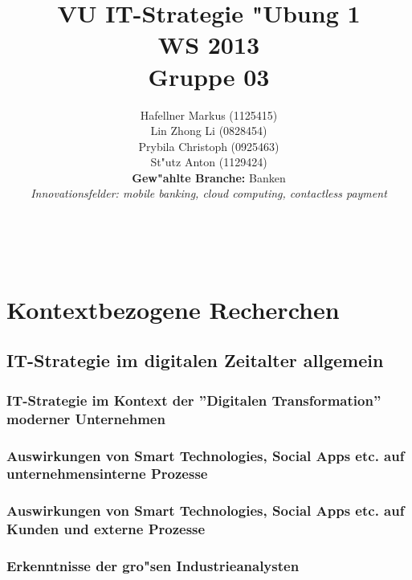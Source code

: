 \documentclass[a4paper, 12pt]{article} %
\title{\textbf{VU IT-Strategie "Ubung 1}\\ %
WS 2013\\\vspace{5pt}
Gruppe 03} %
\author{Hafellner Markus (1125415)\\
 Lin Zhong Li (0828454)\\
 Prybila Christoph (0925463)\\
 St"utz Anton (1129424)\\
 \vspace{10pt}
 \textbf{Gew"ahlte Branche:} Banken
\\{\textit{Innovationsfelder: mobile banking, cloud computing, contactless payment}}} %
\makeatletter
\renewcommand{\maketitle}{ %
\begin{flushright} %
{\LARGE\@title} %

\vspace{50pt} %

{\large\@author} %
\\ \vspace{10pt}\@date %

\vspace{40pt} %
\end{flushright}
}
\makeatother
\begin{document}
\maketitle %

\newpage

\tableofcontents

\newpage


\section{Kontextbezogene Recherchen}
\subsection{IT-Strategie im digitalen Zeitalter allgemein}
\label{subsec:StrategieAllgemein}

\subsubsection{IT-Strategie im Kontext der ''Digitalen Transformation'' moderner Unternehmen}


\subsubsection{Auswirkungen von Smart Technologies, Social Apps etc. auf unternehmensinterne Prozesse}


\subsubsection{Auswirkungen von Smart Technologies, Social Apps etc. auf Kunden und externe Prozesse}


\subsubsection{Erkenntnisse der gro"sen Industrieanalysten}

\end{document}
